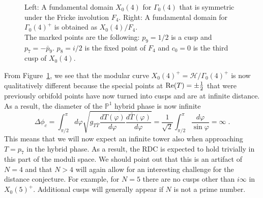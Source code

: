 \documentclass[11pt,a4paper]{article}
\numberwithin{equation}{section}
\numberwithin{table}{section}\setlength{\multlinegap}{25pt}
\begin{document}
\begin{figure}
    \centering
    \quad
    \raisebox{-0.5\height}{$\Longrightarrow$}
    \quad
    \caption{Left: A fundamental domain $X_0(4)$ for $\Gamma_0(4)$ that is symmetric under the Fricke involution $F_4$. Right: A fundamental domain for $\Gamma_0(4)^+$ is obtained as $X_0(4)/F_4$.\\The marked points are the following: $p_9=1/2$ is a cusp and $p_7=-\bar{p}_9$. $p_8=i/2$ is the fixed point of $F_4$ and $c_0=0$ is the third cusp of $X_0(4)$.}
    \label{fig:gamma4fundomain}
\end{figure}
From Figure~\ref{fig:gamma4fundomain}, we see that the modular curve $X_0(4)^+=\mathcal{H}/\Gamma_0(4)^+$ is now qualitatively different because the special points at $\textup{Re}(T)=\pm\tfrac12$ that were previously orbifold points have now turned into cusps and are at infinite distance. As a result, the diameter of the $\mathbb{P}^1$ hybrid phase is now infinite
\begin{equation}
    \label{eq:1122222DeltaPhiExact}
    \Delta\phi_c=\int_{\pi/2}^{\pi}d\varphi \sqrt{g_{T\bar{T}}\frac{d T(\varphi)}{d\varphi}\frac{d \bar{T}(\varphi)}{d\varphi}}=\frac{1}{\sqrt{2}}\int_{\pi/2}^{\pi} \frac{d\varphi}{\sin\varphi}=\infty\;.
\end{equation}
This means that we will now expect an infinite tower also when approaching $T=p_7$ in the hybrid phase. As a result, the RDC is expected to hold trivially in this part of the moduli space. We should point out that this is an artifact of $N=4$ and that $N>4$ will again allow for an interesting challenge for the distance conjecture. For example, for $N=5$ there are no cusps other than $i\infty$ in $X_0(5)^+$. Additional cusps will generally appear if $N$ is not a prime number.

\end{document}
